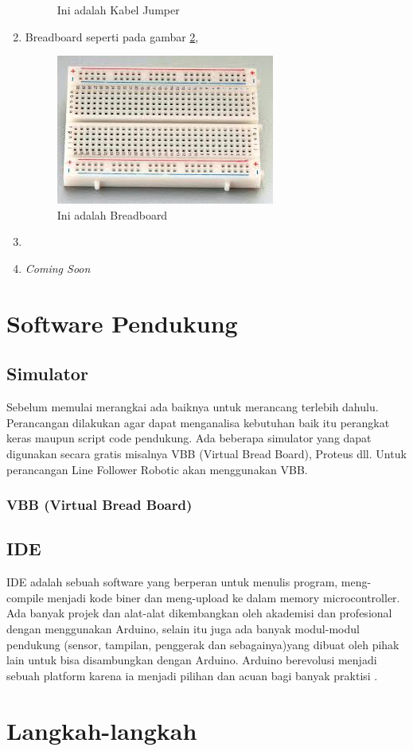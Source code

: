 \begin{enumerate}
\begin{figure}[!htbp]
  \caption{Ini adalah Kabel Jumper}\label{fig:jumper}
\end{figure}
  \item Breadboard seperti pada gambar \ref{fig:breadboard},
  \begin{figure}[!htbp]
  \centering
  \includegraphics[width=.75\textwidth]{figures/Arduino/breadboard.jpg}
  \caption{Ini adalah Breadboard}\label{fig:breadboard}
\end{figure}
  \item 
  \item \textit{Coming Soon}
\end{enumerate}

\section{Software Pendukung}
\subsection{Simulator}
Sebelum memulai merangkai ada baiknya untuk merancang terlebih dahulu. Perancangan dilakukan agar dapat menganalisa kebutuhan baik itu perangkat keras maupun script code pendukung. Ada beberapa simulator yang dapat digunakan secara gratis misalnya VBB (Virtual Bread Board), Proteus dll. Untuk perancangan Line Follower Robotic akan menggunakan VBB.
\subsubsection{VBB (Virtual Bread Board)}


\subsection{IDE}
IDE adalah sebuah software yang berperan untuk menulis program, meng-compile menjadi kode biner dan meng-upload ke dalam memory microcontroller. Ada banyak projek dan alat-alat dikembangkan oleh akademisi dan profesional dengan menggunakan Arduino, selain itu juga ada banyak modul-modul pendukung (sensor, tampilan, penggerak dan sebagainya)yang dibuat oleh pihak lain untuk bisa disambungkan dengan Arduino. Arduino berevolusi menjadi sebuah platform karena ia menjadi pilihan dan acuan bagi banyak praktisi \cite{djuandi2011pengenalan}.

\section{Langkah-langkah} 